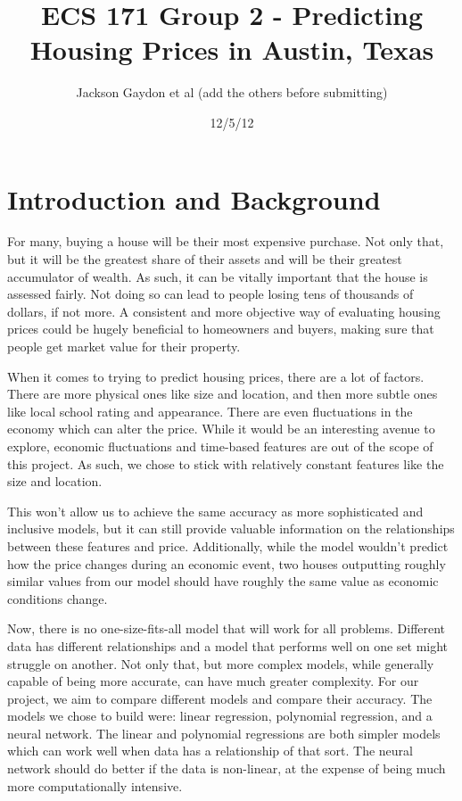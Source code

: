 \documentclass[12pt]{article}
\begin{document}
	\title{ECS 171 Group 2 - Predicting Housing Prices in Austin, Texas}
	\author{Jackson Gaydon et al (add the others before submitting)}
	\date{12/5/12} 
	\maketitle
	
	\section{Introduction and Background} 
	
	For many, buying a house will be their most expensive purchase. Not only that, but it will be the greatest share of their assets and will be their greatest accumulator of wealth. As such, it can be vitally important that the house is assessed fairly. Not doing so can lead to people losing tens of thousands of dollars, if not more. A consistent and more objective way of evaluating housing prices could be hugely beneficial to homeowners and buyers, making sure that people get market value for their property.
	
	When it comes to trying to predict housing prices, there are a lot of factors. There are more physical ones like size and location, and then more subtle ones like local school rating and appearance. There are even fluctuations in the economy which can alter the price. While it would be an interesting avenue to explore, economic fluctuations and time-based features are out of the scope of this project. As such, we chose to stick with relatively constant features like the size and location.
	
	This won’t allow us to achieve the same accuracy as more sophisticated and inclusive models, but it can still provide valuable information on the relationships between these features and price. Additionally, while the model wouldn’t predict how the price changes during an economic event, two houses outputting roughly similar values from our model should have roughly the same value as economic conditions change. 
	
	Now, there is no one-size-fits-all model that will work for all problems. Different data has different relationships and a model that performs well on one set might struggle on another. Not only that, but more complex models, while generally capable of being more accurate, can have much greater complexity. For our project, we aim to compare different models and compare their accuracy. The models we chose to build were: linear regression, polynomial regression, and a neural network. The linear and polynomial regressions are both simpler models which can work well when data has a relationship of that sort. The neural network should do better if the data is non-linear, at the expense of being much more computationally intensive.
	
\end{document}
